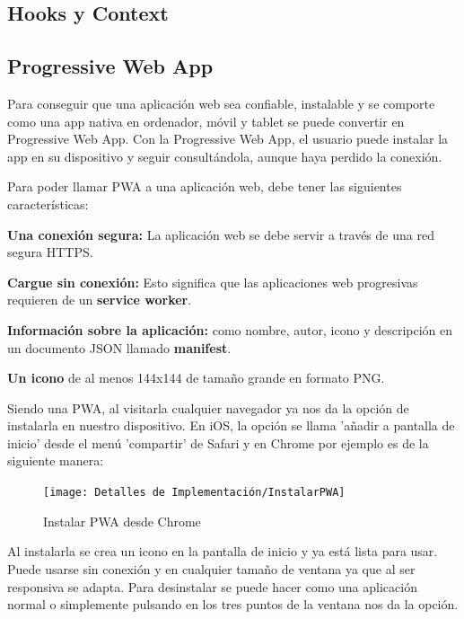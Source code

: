 \documentclass[12pt,twoside,titlepage]{report}
\begin{document}
\subsection{Hooks y Context}

\subsection{Progressive Web App}
Para conseguir que una aplicación web sea confiable, instalable y se comporte como una app nativa en ordenador, móvil y tablet se puede convertir en Progressive Web App. Con la Progressive Web App, el usuario puede instalar la app en su dispositivo y seguir consultándola, aunque haya perdido la conexión.

Para poder llamar PWA a una aplicación web, debe tener las siguientes características:

\begin{compactitem}

    \item \textbf{Una conexión segura:} La aplicación web se debe servir a través de una red segura HTTPS.
    \item \textbf{Cargue sin conexión:} Esto significa que las aplicaciones web progresivas requieren de un \textbf{service worker}.
    \item \textbf{Información sobre la aplicación:} como nombre, autor, icono y descripción en un documento JSON llamado \textbf{manifest}.
    \item \textbf{Un icono} de al menos 144x144 de tamaño grande en formato PNG.
\end{compactitem}

Siendo una PWA, al visitarla cualquier navegador ya nos da la opción de instalarla en nuestro dispositivo. En iOS, la opción se llama 'añadir a pantalla de inicio' desde el menú 'compartir' de Safari y en Chrome por ejemplo es de la siguiente manera:

\begin{figure}[H]
    \centering
    \texttt{[image: Detalles de Implementación/InstalarPWA]}
    \label{fig:InstalarPWA}
    \caption{Instalar PWA desde Chrome}
\end{figure}

Al instalarla se crea un icono en la pantalla de inicio y ya está lista para usar. Puede usarse sin conexión y en cualquier tamaño de ventana ya que al ser responsiva se adapta. Para desinstalar se puede hacer como una aplicación normal o simplemente pulsando en los tres puntos de la ventana nos da la opción.
\end{document}
